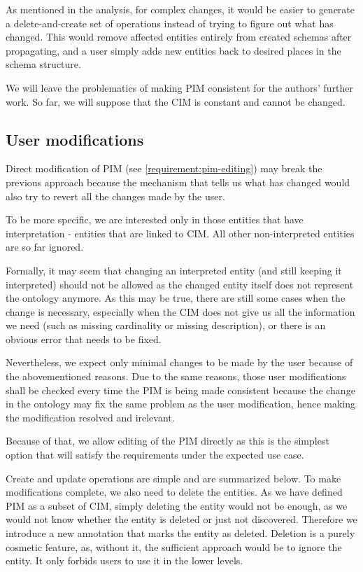 As mentioned in the analysis, for complex changes, it would be easier to generate a delete-and-create set of operations instead of trying to figure out what has changed. This would remove affected entities entirely from created schemas after propagating, and a user simply adds new entities back to desired places in the schema structure.

\medskip

We will leave the problematics of making PIM consistent for the authors' further work. So far, we will suppose that the CIM is constant and cannot be changed.

\subsection{User modifications}\label{section:pim-user-modifications}

Direct modification of PIM (see \autoref{requirement:pim-editing}) may break the previous approach because the mechanism that tells us what has changed would also try to revert all the changes made by the user.

To be more specific, we are interested only in those entities that have interpretation - entities that are linked to CIM. All other non-interpreted entities are so far ignored.

Formally, it may seem that changing an interpreted entity (and still keeping it interpreted) should not be allowed as the changed entity itself does not represent the ontology anymore. As this may be true, there are still some cases when the change is necessary, especially when the CIM does not give us all the information we need (such as missing cardinality or missing description), or there is an obvious error that needs to be fixed.

\medskip

Nevertheless, we expect only minimal changes to be made by the user because of the abovementioned reasons. Due to the same reasons, those user modifications shall be checked every time the PIM is being made consistent because the change in the ontology may fix the same problem as the user modification, hence making the modification resolved and irelevant.

Because of that, we allow editing of the PIM directly as this is the simplest option that will satisfy the requirements under the expected use case.

Create and update operations are simple and are summarized below. To make modifications complete, we also need to delete the entities. As we have defined PIM as a subset of CIM, simply deleting the entity would not be enough, as we would not know whether the entity is deleted or just not discovered. Therefore we introduce a new annotation that marks the entity as deleted. Deletion is a purely cosmetic feature, as, without it, the sufficient approach would be to ignore the entity. It only forbids users to use it in the lower levels.

